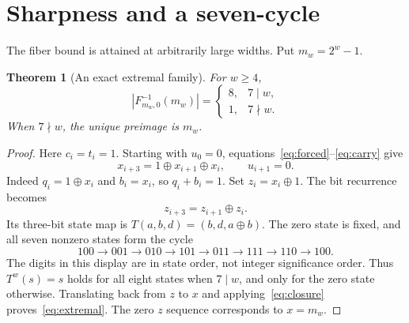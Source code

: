 \documentclass[11pt,a4paper]{article}
\newtheorem{theorem}{Theorem}
\newcommand{\xor}{\mathbin{\oplus}}
\begin{document}
\section{Sharpness and a seven-cycle}\label{sec:sharp}
The fiber bound is attained at arbitrarily large widths. Put $m_w=2^w-1$.

\begin{theorem}[An exact extremal family]\label{thm:sharp}
For $w\ge4$,
\begin{equation}\label{eq:extremal}
 |F_{m_w,0}^{-1}(m_w)|=
 \begin{cases}8,&7\mid w,\\1,&7\nmid w.\end{cases}
\end{equation}
When $7\nmid w$, the unique preimage is $m_w$.
\end{theorem}

\begin{proof}
Here $c_i=t_i=1$. Starting with $u_0=0$, equations~\eqref{eq:forced}--\eqref{eq:carry} give
\[
 x_{i+3}=1\xor x_{i+1}\xor x_i,\qquad u_{i+1}=0.
\]
Indeed $q_i=1\xor x_i$ and $b_i=x_i$, so $q_i+b_i=1$.
Set $z_i=x_i\xor1$. The bit recurrence becomes
\begin{equation}\label{eq:linear}
 z_{i+3}=z_{i+1}\xor z_i.
\end{equation}
Its three-bit state map is $T(a,b,d)=(b,d,a\xor b)$. The zero state is fixed, and all seven nonzero states form the cycle
\[
 100\to001\to010\to101\to011\to111\to110\to100.
\]
The digits in this display are in state order, not integer significance order. Thus $T^w(s)=s$ holds for all eight states when $7\mid w$, and only for the zero state otherwise. Translating back from $z$ to $x$ and applying~\eqref{eq:closure} proves~\eqref{eq:extremal}. The zero $z$ sequence corresponds to $x=m_w$.
\end{proof}
\end{document}
